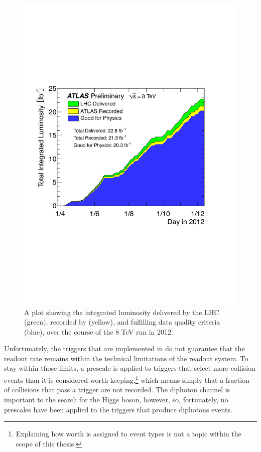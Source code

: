 \begin{figure}[htp]
\begin{minipage}[b]{.57\textwidth}
\hspace{-1em}\includegraphics[width=\textwidth]{figures/intlumi}
\end{minipage}\hfill\begin{minipage}[b]{.4\textwidth}
\caption{A plot \cite{publiclumi} showing the integrated luminosity delivered by the LHC (green), recorded by \atlas{} (yellow), and fulfilling data quality criteria (blue), over the course of the 8 TeV run in 2012.
\label{intlumi}}
\end{minipage}
\end{figure}

Unfortunately, the triggers that are implemented in \atlas{} do not guarantee that the readout rate remains within the technical limitations of the readout system. To stay within those limits, a prescale is applied to triggers that select more collision events than it is considered worth keeping,\footnote{Explaining how worth is assigned to event types is not a topic within the scope of this thesis.} which means simply that a fraction of collisions that pass a trigger are not recorded. The diphoton channel is important to the search for the Higgs boson, however, so, fortunately, no prescales have been applied to the triggers that produce diphotons events.

